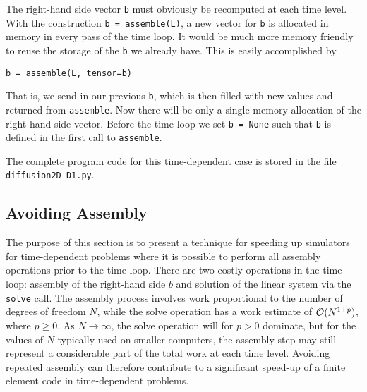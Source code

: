 The right-hand side vector {\fontsize{12pt}{12pt}\texttt{b}} must obviously 
be recomputed at each time level.
With the construction {\fontsize{12pt}{12pt}\texttt{b = assemble(L)}}, a new
vector for {\fontsize{12pt}{12pt}\texttt{b}} is allocated in memory in every pass of the time loop.
It would be much more memory friendly to reuse the storage of the {\fontsize{12pt}{12pt}\texttt{b}}
we already have.
This is easily accomplished by
\begin{Verbatim}[fontsize=\fontsize{10pt}{10pt},tabsize=8,baselinestretch=1.05,
fontfamily=tt,xleftmargin=7mm]
    b = assemble(L, tensor=b)
\end{Verbatim}
\noindent
That is, we send in our previous {\fontsize{12pt}{12pt}\texttt{b}}, which is then filled with new values
and returned from {\fontsize{12pt}{12pt}\texttt{assemble}}. Now there will be only a single
memory allocation of the right-hand side vector. Before the time loop
we set {\fontsize{12pt}{12pt}\texttt{b = None}} such that {\fontsize{12pt}{12pt}\texttt{b}} is defined in the first call to
{\fontsize{12pt}{12pt}\texttt{assemble}}.

The complete program code for this time-dependent case is stored in
the file {\fontsize{12pt}{12pt}\verb!diffusion2D_D1.py!}.

\subsection{Avoiding Assembly}
\label{langtangen:timedep:diffusion1:noassemble}

The purpose of this section is to present a technique for speeding
up \fenics{} simulators for time-dependent problems where it is
possible to perform all assembly operations prior to the time loop.
There are two costly operations in the time loop: assembly of the
right-hand side $b$ and solution of the linear system via the
{\fontsize{12pt}{12pt}\texttt{solve}} call. The assembly process involves work proportional to
the number of degrees of freedom $N$, while the solve operation
has a work estimate of ${\cal O}( N^{1+p})$, where $p\geq 0$. As
$N\rightarrow\infty$, the solve operation will for $p>0$ dominate,
but for the values of $N$ typically used on smaller computers, the
assembly step may still 
represent a considerable part of the total work at each
time level. Avoiding repeated assembly can therefore contribute to a
significant speed-up of a finite element code in time-dependent problems.

